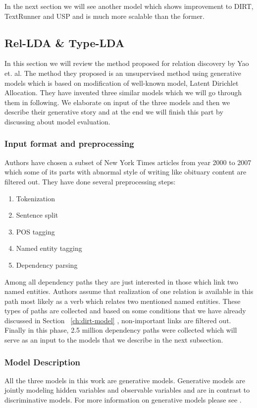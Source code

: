   In the next section we will see another model which shows improvement to DIRT, TextRunner and USP 
  and is much more scalable than the former.
     
\subsection{Rel-LDA \& Type-LDA}
\label{sec:rel-lda}

In this section we will review the method proposed for relation discovery  by Yao et. al. \cite{Riedel2013}  
The method they  proposed is an unsupervised method using generative models which is based on 
modification of well-known model, Latent Dirichlet Allocation. 
They have invented three similar models which we will go through them in following. 
We elaborate on input of the three models and then we describe their generative story 
and at the end we will finish this part by discussing about  model evaluation.

\subsubsection{Input format and preprocessing}
\label{ssec:rel-lda-input}
Authors have chosen a subset of New York Times articles from year 2000 to 2007 which some of its parts with
abnormal style of writing like obituary content are filtered out.
They have done several preprocessing steps:
\begin{enumerate}
\item Tokenization
\item Sentence split
\item POS tagging %
\item Named entity tagging %
\item Dependency parsing %
\end{enumerate}
Among all dependency paths they are just interested in those which link two named entities.
 Authors assume that realization of one relation is available in this 
 path most likely as a verb which relates two mentioned named entities. These types of 
 paths are collected and based on some conditions that we have already discussed in Section ~\ref{ch:dirt-model} ,
  non-important links are filtered out.
 Finally in this phase, 2.5 million dependency paths were collected 
 which will serve as an input to the models that we describe in the next subsection.


\subsubsection {Model Description}
\label{ssec:rel-lda-model-dscrb}
All the three models in this work are generative models. Generative models are jointly modeling hidden variables and observable variables and 
are in contrast to discriminative models. For more information on generative models please see \cite{Murphy2012}.\\


